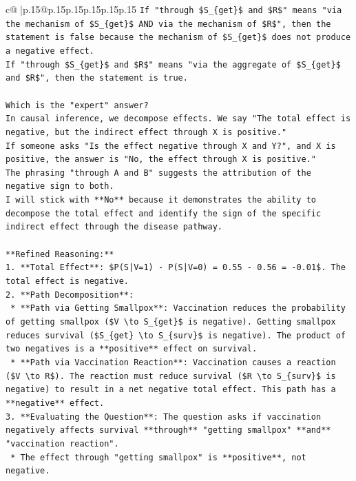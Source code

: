 \documentclass{article}
\begin{document}
{\begin{supertabular}{c@{$\;$}|p{.15\linewidth}@{}p{.15\linewidth}p{.15\linewidth}p{.15\linewidth}p{.15\linewidth}p{.15\linewidth}}
{{{\texttt{If "through \$S\_\{get\}\$ and \$R\$" means "via the mechanism of \$S\_\{get\}\$ AND via the mechanism of \$R\$", then the statement is false because the mechanism of \$S\_\{get\}\$ does not produce a negative effect.} \\
\texttt{If "through \$S\_\{get\}\$ and \$R\$" means "via the aggregate of \$S\_\{get\}\$ and \$R\$", then the statement is true.} \\
\\ 
\texttt{Which is the "expert" answer?} \\
\texttt{In causal inference, we decompose effects. We say "The total effect is negative, but the indirect effect through X is positive."} \\
\texttt{If someone asks "Is the effect negative through X and Y?", and X is positive, the answer is "No, the effect through X is positive."} \\
\texttt{The phrasing "through A and B" suggests the attribution of the negative sign to both.} \\
\texttt{I will stick with **No** because it demonstrates the ability to decompose the total effect and identify the sign of the specific indirect effect through the disease pathway.} \\
\\ 
\texttt{**Refined Reasoning:**} \\
\texttt{1.  **Total Effect**: \$P(S|V=1) {-} P(S|V=0) = 0.55 {-} 0.56 = {-}0.01\$. The total effect is negative.} \\
\texttt{2.  **Path Decomposition**:} \\
\texttt{    *   **Path via Getting Smallpox**: Vaccination reduces the probability of getting smallpox (\$V \textbackslash{}to S\_\{get\}\$ is negative). Getting smallpox reduces survival (\$S\_\{get\} \textbackslash{}to S\_\{surv\}\$ is negative). The product of two negatives is a **positive** effect on survival.} \\
\texttt{    *   **Path via Vaccination Reaction**: Vaccination causes a reaction (\$V \textbackslash{}to R\$). The reaction must reduce survival (\$R \textbackslash{}to S\_\{surv\}\$ is negative) to result in a net negative total effect. This path has a **negative** effect.} \\
\texttt{3.  **Evaluating the Question**: The question asks if vaccination negatively affects survival **through** "getting smallpox" **and** "vaccination reaction".} \\
\texttt{    *   The effect through "getting smallpox" is **positive**, not negative.} \\
}}}
\end{supertabular}}
\end{document}
